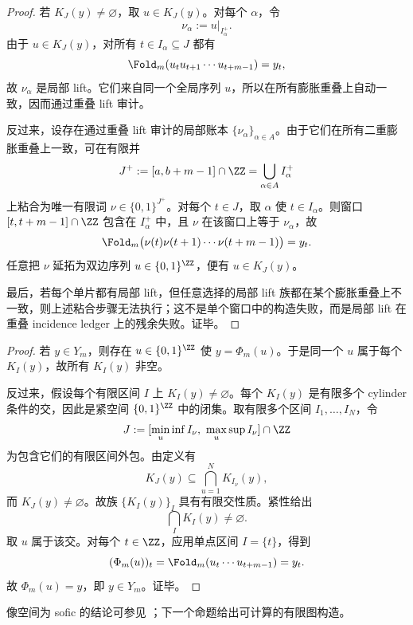 \begin{proof}
若 \(K_J(y)\ne\varnothing\)，取 \(u\in K_J(y)\)。对每个 \(\alpha\)，令
\[
\nu_\alpha:=u|_{I_\alpha^{+}}.
\]
由于 \(u\in K_J(y)\)，对所有 \(t\in I_\alpha\subseteq J\) 都有
\[
\Fold_m(u_tu_{t+1}\cdots u_{t+m-1})=y_t,
\]
故 \(\nu_\alpha\) 是局部 lift。它们来自同一个全局序列 \(u\)，所以在所有膨胀重叠上自动一致，因而通过重叠 lift 审计。

反过来，设存在通过重叠 lift 审计的局部账本 \(\{\nu_\alpha\}_{\alpha\in A}\)。由于它们在所有二重膨胀重叠上一致，可在有限并
\[
J^{+}:=[a,b+m-1]\cap\ZZ=\bigcup_{\alpha\in A} I_\alpha^{+}
\]
上粘合为唯一有限词 \(\nu\in\{0,1\}^{J^{+}}\)。对每个 \(t\in J\)，取 \(\alpha\) 使 \(t\in I_\alpha\)。则窗口
\([t,t+m-1]\cap\ZZ\) 包含在 \(I_\alpha^{+}\) 中，且 \(\nu\) 在该窗口上等于 \(\nu_\alpha\)，故
\[
\Fold_m\bigl(\nu(t)\nu(t+1)\cdots\nu(t+m-1)\bigr)=y_t.
\]
任意把 \(\nu\) 延拓为双边序列 \(u\in\{0,1\}^{\ZZ}\)，便有 \(u\in K_J(y)\)。

最后，若每个单片都有局部 lift，但任意选择的局部 lift 族都在某个膨胀重叠上不一致，则上述粘合步骤无法执行；这不是单个窗口中的构造失败，而是局部 lift 在重叠 incidence ledger 上的残余失败。证毕。
\end{proof}

\begin{proof}
若 \(y\in Y_m\)，则存在 \(u\in\{0,1\}^{\ZZ}\) 使 \(y=\Phi_m(u)\)。于是同一个 \(u\) 属于每个 \(K_I(y)\)，故所有 \(K_I(y)\) 非空。

反过来，假设每个有限区间 \(I\) 上 \(K_I(y)\ne\varnothing\)。每个 \(K_I(y)\) 是有限多个 cylinder 条件的交，因此是紧空间 \(\{0,1\}^{\ZZ}\) 中的闭集。取有限多个区间 \(I_1,\ldots,I_N\)，令
\[
J:=[\min_
u \inf I_\nu,\ \max_
u \sup I_\nu]\cap\ZZ
\]
为包含它们的有限区间外包。由定义有
\[
K_J(y)\subseteq\bigcap_{
u=1}^N K_{I_\nu}(y),
\]
而 \(K_J(y)\ne\varnothing\)。故族 \(\{K_I(y)\}_I\) 具有有限交性质。紧性给出
\[
\bigcap_I K_I(y)\ne\varnothing.
\]
取 \(u\) 属于该交。对每个 \(t\in\ZZ\)，应用单点区间 \(I=\{t\}\)，得到
\[
(\Phi_m(u))_t=\Fold_m(u_t\cdots u_{t+m-1})=y_t.
\]
故 \(\Phi_m(u)=y\)，即 \(y\in Y_m\)。证毕。
\end{proof}

像空间为 sofic 的结论可参见 \cite{LindMarcus1995}；下一个命题给出可计算的有限图构造。
